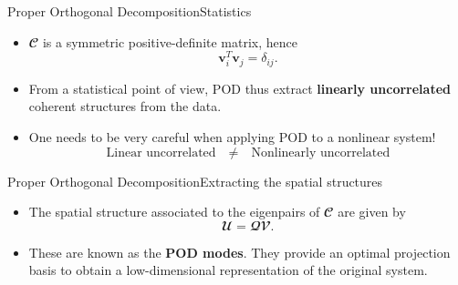 \documentclass[usenames,dvipsnames,svgnames,10pt,aspectratio=169]{beamer}
\begin{document}
\begin{frame}[t, c]{Proper Orthogonal Decomposition}{Statistics}
	\begin{itemize}
		\item $\mathbfcal{C}$ is a symmetric positive-definite matrix, hence
		$$\mathbf{v}_i^T \mathbf{v}_j = \delta_{ij}.$$

		\medskip

		\item From a statistical point of view, POD thus extract \alert{\textbf{linearly uncorrelated}} coherent structures from the data.

		\bigskip

		\item One needs to be very careful when applying POD to a nonlinear system!
		$$\text{Linear uncorrelated}\quad \neq \quad \text{Nonlinearly uncorrelated}$$
	\end{itemize}

	\vspace{1cm}
\end{frame}

\begin{frame}[t, c]{Proper Orthogonal Decomposition}{Extracting the spatial structures}
	\begin{itemize}
		\item The spatial structure associated to the eigenpairs of $\mathbfcal{C}$ are given by
		$$\mathbfcal{U} = \mathbfcal{Q} \mathbfcal{V}.$$

		\bigskip

		\item These are known as the \alert{\textbf{POD modes}}. They provide an optimal projection basis to obtain a low-dimensional representation of the original system.
	\end{itemize}

	\vspace{1cm}
\end{frame}
\end{document}
